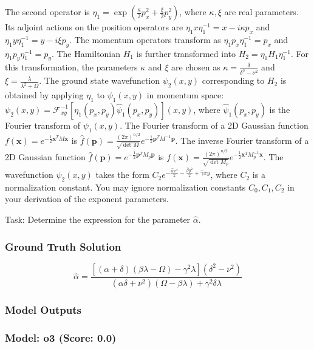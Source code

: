 \documentclass[10pt]{article}
\begin{document}
The second operator is $\eta_1 = \exp\left( \frac{\kappa}{2} p_x^2 +\frac{\xi}{2} p_y^2 \right)$, where $\kappa, \xi$ are real parameters. Its adjoint actions on the position operators are $\eta_1 x \eta_1^{-1} = x - i \kappa p_x$ and $\eta_1 y \eta_1^{-1} = y - i \xi p_y$. The momentum operators transform as $\eta_1 p_x \eta_1^{-1} = p_x$ and $\eta_1 p_y \eta_1^{-1} = p_y$.
The Hamiltonian $H_1$ is further transformed into $H_2 = \eta_1 H_1 \eta_1^{-1}$. For this transformation, the parameters $\kappa$ and $\xi$ are chosen as $\kappa = \frac{\delta}{\delta^2 - \nu^2}$ and $\xi = \frac{\lambda}{\lambda^2 + \Omega}$.
The ground state wavefunction $\psi_2(x,y)$ corresponding to $H_2$ is obtained by applying $\eta_1$ to $\psi_1(x,y)$ in momentum space: $\psi_2(x,y) = \mathcal{F}^{-1}_{xy} \left[ \eta_1(p_x,p_y) \hat{\psi}_1(p_x,p_y) \right] (x,y)$, where $\hat{\psi}_1(p_x,p_y)$ is the Fourier transform of $\psi_1(x,y)$.
The Fourier transform of a 2D Gaussian function $f(\mathbf{x}) = e^{-\frac{1}{2}\mathbf{x}^T M \mathbf{x}}$ is $\hat{f}(\mathbf{p}) = \frac{(2\pi)^{n/2}}{\sqrt{\det M}} e^{-\frac{1}{2}\mathbf{p}^T M^{-1} \mathbf{p}}$.
The inverse Fourier transform of a 2D Gaussian function $\hat{f}(\mathbf{p}) = e^{-\frac{1}{2}\mathbf{p}^T M_p \mathbf{p}}$ is $f(\mathbf{x}) = \frac{(2\pi)^{n/2}}{\sqrt{\det M_p}} e^{-\frac{1}{2}\mathbf{x}^T M_p^{-1} \mathbf{x}}$.
The wavefunction $\psi_2(x,y)$ takes the form $C_2 e^{-\frac{\hat{\alpha} x^2}{2}-\frac{\hat{\beta} y^2}{2} +\hat{\gamma} x y}$, where $C_2$ is a normalization constant. You may ignore normalization constants $C_0, C_1, C_2$ in your derivation of the exponent parameters.

Task:
Determine the expression for the parameter $\hat{\alpha}$.

\subsubsection*{Ground Truth Solution}
\[ \boxed{\hat{\alpha} = \frac{ \left[(\alpha +\delta ) (\beta  \lambda -\Omega )-\gamma ^2 \lambda \right] \left(\delta ^2-\nu ^2\right) }{\left(\alpha  \delta +\nu ^2\right) (\Omega -\beta  \lambda )+\gamma ^2 \delta  \lambda }} \]

\subsubsection*{Model Outputs}
\subsubsection*{Model: o3 (Score: 0.0)}
\end{document}
